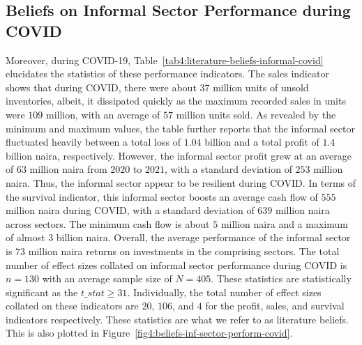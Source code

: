 \documentclass[a4paper, 12pt]{article}
\begin{document}
    \subsection{Beliefs on Informal Sector Performance during COVID}\label{subsec4.2:literature-beliefs-on-informal-sector-performance-during-covid-19}
    Moreover, during COVID-19, Table~\ref{tab4:literature-beliefs-informal-covid} elucidates the statistics of these performance indicators. The sales indicator shows that during COVID, there were about $37$ million units of unsold inventories, albeit, it dissipated quickly as the maximum recorded sales in units were $109$ million, with an average of $57$ million units sold. As revealed by the minimum and maximum values, the table further reports that the informal sector fluctuated heavily between a total loss of $1.04$ billion and a total profit of $1.4$ billion naira, respectively. However, the informal sector profit grew at an average of $63$ million naira from $2020$ to $2021$, with a standard deviation of $253$ million naira. Thus, the informal sector appear to be resilient during COVID. In terms of the survival indicator, this informal sector boosts an average cash flow of $555$ million naira during COVID, with a standard deviation of $639$ million naira across sectors. The minimum cash flow is about $5$ million naira and a maximum of almost $3$ billion naira. Overall, the average performance of the informal sector is $73$ million naira returns on investments in the comprising sectors. The total number of effect sizes collated on informal sector performance during COVID is $n = 130$ with an average sample size of $N = 405$. These statistics are statistically significant as the $t\_stat \geq 31$. Individually, the total number of effect sizes collated on these indicators are $20$, $106$, and $4$ for the profit, sales, and survival indicators respectively. These statistics are what we refer to as literature beliefs. This is also plotted in Figure~\ref{fig4:beliefs-inf-sector-perform-covid}.
\end{document}

